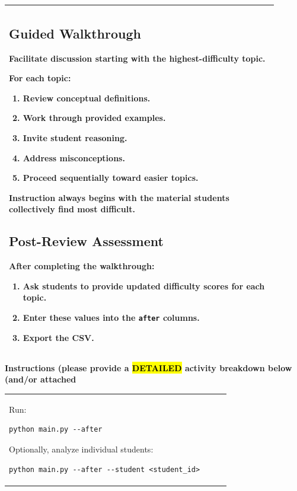 \documentclass{article}
\begin{document}
\begin{flushleft}
\begin{tabular}{|p{0.9\linewidth}|}
\subsection{Guided Walkthrough}

Facilitate discussion starting with the highest-difficulty topic.

For each topic:

\begin{enumerate}
\item Review conceptual definitions.
\item Work through provided examples.
\item Invite student reasoning.
\item Address misconceptions.
\item Proceed sequentially toward easier topics.
\end{enumerate}

Instruction always begins with the material students collectively find most difficult.

\subsection{Post-Review Assessment}

After completing the walkthrough:

\begin{enumerate}
\item Ask students to provide updated difficulty scores for each topic.
\item Enter these values into the \texttt{after} columns.
\item Export the CSV.
\end{enumerate} \\
\hline
\end{tabular}
\newpage
\noindent
{\large \textbf{Instructions (please provide a \hl{DETAILED} activity breakdown below (and/or attached}} \\
\begin{tabular}{|p{0.9\linewidth}|}
\hline
Run:

\begin{verbatim}
python main.py --after
\end{verbatim}

Optionally, analyze individual students:

\begin{verbatim}
python main.py --after --student <student_id>
\end{verbatim}


\end{tabular}
\end{flushleft}
\end{document}
